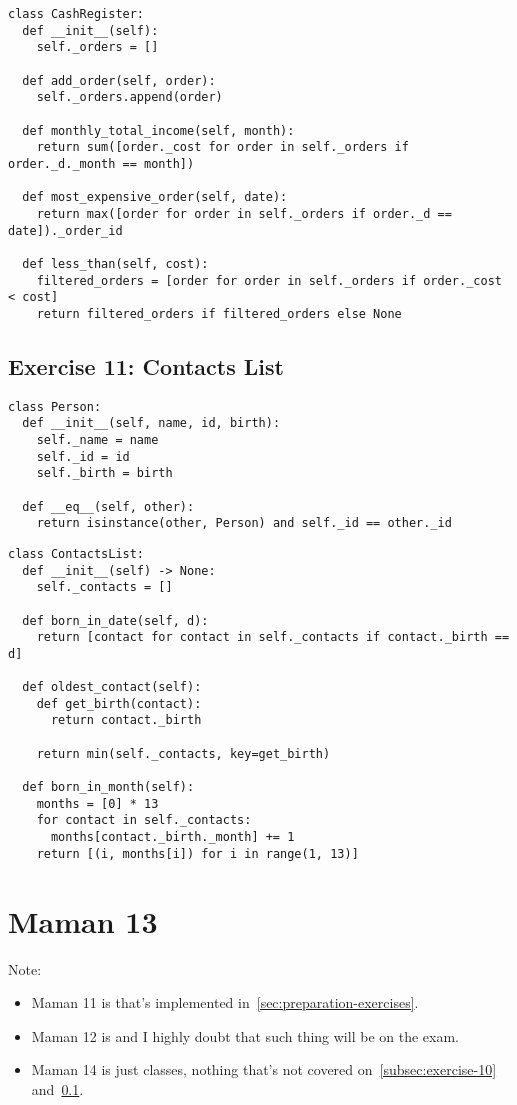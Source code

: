 \documentclass[11pt]{article}
\begin{document}
\begin{lstlisting}
class CashRegister:
  def __init__(self):
    self._orders = []

  def add_order(self, order):
    self._orders.append(order)

  def monthly_total_income(self, month):
    return sum([order._cost for order in self._orders if order._d._month == month])

  def most_expensive_order(self, date):
    return max([order for order in self._orders if order._d == date])._order_id

  def less_than(self, cost):
    filtered_orders = [order for order in self._orders if order._cost < cost]
    return filtered_orders if filtered_orders else None
\end{lstlisting}

\subsection{Exercise 11: Contacts List}\label{subsec:exercise-11}

\begin{lstlisting}
class Person:
  def __init__(self, name, id, birth):
    self._name = name
    self._id = id
    self._birth = birth

  def __eq__(self, other):
    return isinstance(other, Person) and self._id == other._id
\end{lstlisting}

\begin{lstlisting}
class ContactsList:
  def __init__(self) -> None:
    self._contacts = []

  def born_in_date(self, d):
    return [contact for contact in self._contacts if contact._birth == d]

  def oldest_contact(self):
    def get_birth(contact):
      return contact._birth

    return min(self._contacts, key=get_birth)

  def born_in_month(self):
    months = [0] * 13
    for contact in self._contacts:
      months[contact._birth._month] += 1
    return [(i, months[i]) for i in range(1, 13)]
\end{lstlisting}

\section{Maman 13}
\noindent Note:
\begin{itemize}
  \item Maman 11 is  that's implemented in~\cref{sec:preparation-exercises}.
  \item Maman 12 is  and I highly doubt that such thing will be on the exam.
  \item Maman 14 is just classes, nothing that's not covered on~\cref{subsec:exercise-10} and~\cref{subsec:exercise-11}.
\end{itemize}
\end{document}
